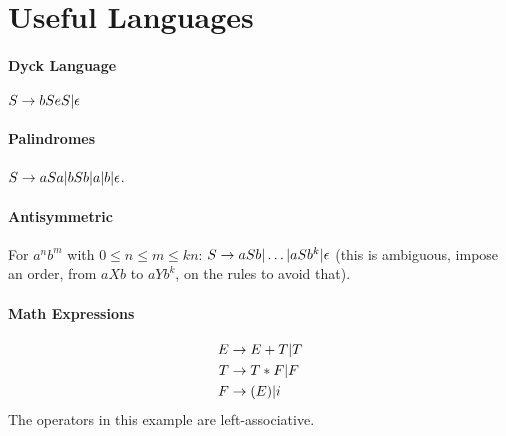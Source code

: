 \section{Useful Languages}

\paragraph{Dyck Language} $S \rightarrow bSeS | \epsilon$
\paragraph{Palindromes} $S \rightarrow aSa | bSb | a | b | \epsilon$.
\paragraph{Antisymmetric} For $a^nb^m$ with $0 \le n \le m \le kn$: $S \rightarrow aSb | \ldots | aSb^k | \epsilon$ (this is ambiguous, impose an order, from $aXb$ to $aYb^k$, on the rules to avoid that).
\paragraph{Math Expressions}
\begin{align*}
    E &\rightarrow E + T | T \\
    T &\rightarrow T * F | F \\
    F &\rightarrow (E) | i
\end{align*}
The operators in this example are left-associative.
